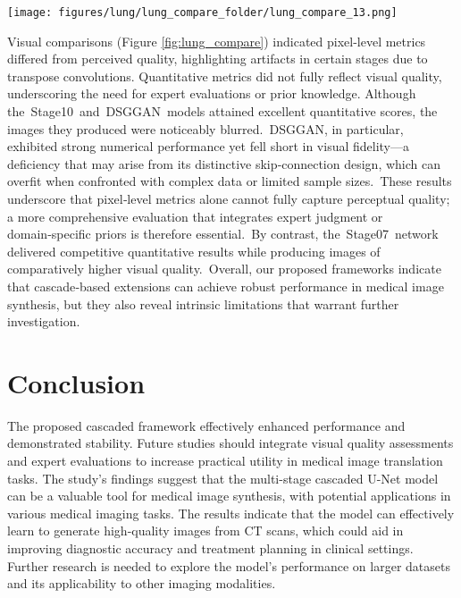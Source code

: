 \documentclass[a4paper, times, 10pt,twocolumn]{article}
\begin{document}
\begin{figure*}[h]
	\centering
	\texttt{[image: figures/lung/lung\_compare\_folder/lung\_compare\_13.png]}
	\caption[lung_compare]{The figure displayed here showcases PET images generated by various models, compared alongside real CT and PET images. The odd rows present the complete paired PET-CT images, while the even rows provide magnified views of specific regions within these pairs. Each model utilizes the CT image located at the extreme left as the input. The real PET images positioned at the extreme right serve as references for comparison. }
	\label{fig:lung_compare}
\end{figure*}
Visual comparisons (Figure \ref{fig:lung_compare}) indicated pixel-level metrics differed from perceived quality, highlighting artifacts in certain stages due to transpose convolutions. Quantitative metrics did not fully reflect visual quality, underscoring the need for expert evaluations or prior knowledge.
Although the Stage10 and DSGGAN models attained excellent quantitative scores, the images they produced were noticeably blurred. DSGGAN, in particular, exhibited strong numerical performance yet fell short in visual fidelity—a deficiency that may arise from its distinctive skip‑connection design, which can overfit when confronted with complex data or limited sample sizes. These results underscore that pixel‑level metrics alone cannot fully capture perceptual quality; a more comprehensive evaluation that integrates expert judgment or domain‑specific priors is therefore essential. By contrast, the Stage07 network delivered competitive quantitative results while producing images of comparatively higher visual quality. Overall, our proposed frameworks indicate that cascade‑based extensions can achieve robust performance in medical image synthesis, but they also reveal intrinsic limitations that warrant further investigation.

\section{Conclusion}
The proposed cascaded framework effectively enhanced performance and demonstrated stability. Future studies should integrate visual quality assessments and expert evaluations to increase practical utility in medical image translation tasks. The study's findings suggest that the multi-stage cascaded U-Net model can be a valuable tool for medical image synthesis, with potential applications in various medical imaging tasks. The results indicate that the model can effectively learn to generate high-quality images from CT scans, which could aid in improving diagnostic accuracy and treatment planning in clinical settings. Further research is needed to explore the model's performance on larger datasets and its applicability to other imaging modalities.
\end{document}
